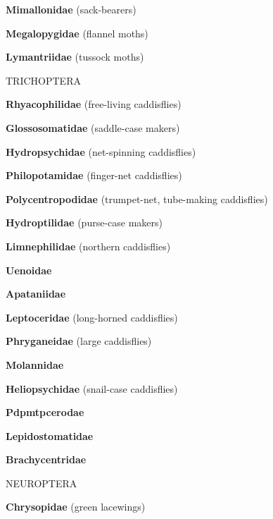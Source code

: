 \documentclass[letterpaper,10pt]{article}
\begin{document}
{\makebox[0.6cm]{}  \textbf{Mimallonidae} (sack-bearers) \par
\makebox[0.6cm]{}  \textbf{Megalopygidae} (flannel moths) \par
\makebox[0.6cm]{}  \textbf{Lymantriidae} (tussock moths) \par
%				
%
%				
\makebox[0.0cm]{}  TRICHOPTERA \par
\makebox[0.6cm]{}  \textbf{Rhyacophilidae} (free-living caddisflies) \par
\makebox[0.6cm]{}  \textbf{Glossosomatidae} (saddle-case makers) \par
\makebox[0.6cm]{}  \textbf{Hydropsychidae} (net-spinning caddisflies) \par
\makebox[0.6cm]{}  \textbf{Philopotamidae} (finger-net caddisflies) \par
\makebox[0.6cm]{}  \textbf{Polycentropodidae} (trumpet-net, tube-making caddisflies) \par
\makebox[0.6cm]{}  \textbf{Hydroptilidae} (purse-case makers) \par
\makebox[0.6cm]{}  \textbf{Limnephilidae} (northern caddisflies) \par
\makebox[0.6cm]{}  \textbf{Uenoidae} \par
\makebox[0.6cm]{}  \textbf{Apataniidae} \par
\makebox[0.6cm]{}  \textbf{Leptoceridae} (long-horned caddisflies) \par
\makebox[0.6cm]{}  \textbf{Phryganeidae} (large caddisflies) \par
\makebox[0.6cm]{}  \textbf{Molannidae} \par
\makebox[0.6cm]{}  \textbf{Heliopsychidae} (snail-case caddisflies) \par
\makebox[0.6cm]{}  \textbf{Pdpmtpcerodae} \par
\makebox[0.6cm]{}  \textbf{Lepidostomatidae} \par
\makebox[0.6cm]{}  \textbf{Brachycentridae} \par
%
%
%
\makebox[0.0cm]{}  NEUROPTERA \par
\makebox[0.6cm]{}  \textbf{Chrysopidae} (green lacewings) \par
}
\end{document}
